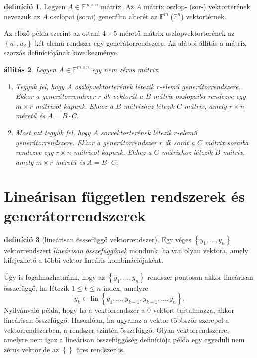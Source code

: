 \documentclass[9pt, showtrims]{memoir}
\theoremstyle{plain}
\newtheorem{proposition}{állítás}[section]
\theoremstyle{remark}
\theoremstyle{definition}
\newtheorem{definition}[proposition]{definíció}
\renewcommand{\mathbf}{\mathbb}
\DeclareMathOperator{\lin}{lin}
\begin{document}
\begin{definition}
    Legyen $A\in\mathbf{F}^{m\times n}$ mátrix.
    Az $A$ mátrix oszlop- (sor-) vektorterének nevezzük az $A$ oszlopai (sorai) generálta alterét az $\mathbf{F}^m$ ($\mathbf{F}^n$)
    vektortérnek.
\end{definition}
Az előző példa szerint az ottani $4\times 5$ méretű mátrix oszlopvektorterének az $\left\{ a_1,a_2 \right\}$ két elemű rendszer
egy generátorrendszere.
Az alábbi állítás a mátrix szorzás definíciójának következménye.
\begin{proposition}
    Legyen $A\in\mathbf{F}^{m\times n}$ egy nem zérus mátrix.
    \begin{enumerate}
    \item 
    Tegyük fel, hogy $A$ oszlopvektorterének létezik $r$-elemű generátorrendszere.
    Ekkor a generátorrendszer $r$ db vektorát a $B$ mátrix oszlopaiba rendezve egy $m\times r$ mátrixot kapunk.
    Ehhez a $B$ mátrixhoz létezik $C$ mátrix, amely $r\times n$ méretű és 
    \(
        A=B\cdot C.
    \)
    \item
    Most azt tegyük fel, hogy $A$ sorvektorterének létezik $r$-elemű generátorrendszere.
    Ekkor a generátorrendszer $r$ db sorát a $C$ mátrix soraiba rendezve egy $r\times n$ mátrixot kapunk.
    Ehhez a $C$ mátrixhoz létezik $B$ mátrix, amely $m\times r$ méretű és 
    \(
        A=B\cdot C.
    \)\qedhere
    \end{enumerate}
\end{proposition}


\section{Lineárisan független rendszerek és generátorrendszerek}
\begin{definition}[lineárisan összefüggő vektorrendszer]
    Egy véges $\left\{ y_1,\dots,y_n \right\}$ vektorrendszert \emph{lineárisan összefüggőnek}
    mondunk, ha van olyan vektora, amely kifejezhető a többi vektor lineáris kombinációjaként.
\end{definition}
Úgy is fogalmazhatnánk, hogy az $\left\{ y_1,\dots,y_n \right\}$ rendszer pontosan akkor
lineárisan összefüggő, ha létezik $1\leq k\leq n$ index, amelyre
\[
    y_k\in\lin\left\{ y_1,\dots,y_{k-1},y_{k+1},\dots,y_n \right\}.
\]
Nyilvánvaló példa, hogy ha a vektorrendszer a $0$ vektort tartalmazza, 
akkor lineárisan összefüggő. 
Hasonlóan, ha ugyanaz a vektor többször szerepel a vektorrendszerben, a rendszer szintén összefüggő.
Olyan vektorrendszerre, amelyre nem igaz a lineárisan összefüggőség definíciója példa egy egyedüli nem zérus vektor,de az $\left\{  \right\}$ üres rendszer is.
\end{document}

